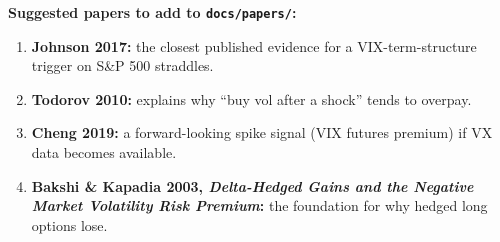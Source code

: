 \documentclass{article}
\begin{document}
\textbf{Suggested papers to add to \texttt{docs/\allowbreak{}papers/\allowbreak{}}:}

\begin{enumerate}

\item \textbf{Johnson 2017:} the closest published evidence for a VIX-term-structure trigger on S\&P 500 straddles.

\item \textbf{Todorov 2010:} explains why ``buy vol after a shock'' tends to overpay.

\item \textbf{Cheng 2019:} a forward-looking spike signal (VIX futures premium) if VX data becomes available.

\item \textbf{Bakshi \& Kapadia 2003, \emph{Delta-Hedged Gains and the Negative Market Volatility Risk Premium}:} the foundation for why hedged long options lose.

\end{enumerate}
\end{document}
